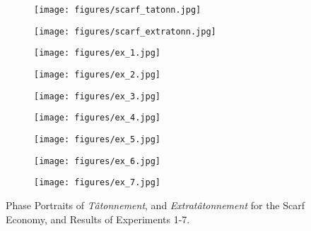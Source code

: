 
\begin{figure}[htbp]
    \begin{subfigure}{0.3\textwidth}
        \centering
        \texttt{[image: figures/scarf\_tatonn.jpg]}
    \end{subfigure}
    \hfill
    \begin{subfigure}{0.3\textwidth}
        \centering
        \texttt{[image: figures/scarf\_extratonn.jpg]}
    \end{subfigure}
    \hfill
    \begin{subfigure}{0.3\textwidth}
        \centering
        \hspace{1cm}
        \texttt{[image: figures/ex\_1.jpg]}    
    \end{subfigure}
    \vspace{0.3cm}
    \begin{subfigure}{0.3\textwidth}
        \centering
        \texttt{[image: figures/ex\_2.jpg]}
    \end{subfigure}
    \hfill
    \begin{subfigure}{0.3\textwidth}
        \centering
        \texttt{[image: figures/ex\_3.jpg]}
    \end{subfigure}
    \hfill
    \begin{subfigure}{0.3\textwidth}
        \centering
        \texttt{[image: figures/ex\_4.jpg]}
    \end{subfigure}
    \hfill
    \begin{subfigure}{0.3\textwidth}
        \centering
        \texttt{[image: figures/ex\_5.jpg]}
    \end{subfigure}
    \hfill
    \begin{subfigure}{0.3\textwidth}
        \texttt{[image: figures/ex\_6.jpg]}
    \end{subfigure}
    \hfill
    \begin{subfigure}{0.3\textwidth}
        \centering
        \texttt{[image: figures/ex\_7.jpg]}
    \end{subfigure}
    
    \caption{Phase Portraits  of \emph{T\^atonnement}, and \emph{Extrat\^atonnement} for the Scarf Economy, and Results of Experiments 1-7.}
    \label{fig:exp_results}
\end{figure}

